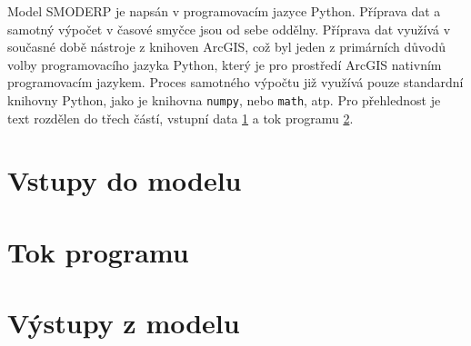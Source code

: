 Model SMODERP je napsán v programovacím jazyce Python. Příprava dat a samotný výpočet v časové smyčce jsou od sebe oddělny. Příprava dat využívá v současné době nástroje z knihoven ArcGIS, což byl jeden z primárních důvodů volby  programovacího jazyka Python, který je pro prostředí ArcGIS nativním programovacím jazykem. Proces samotného výpočtu již využívá pouze standardní knihovny Python, jako je knihovna \texttt{numpy}, nebo \texttt{math}, atp. Pro přehlednost je text rozdělen do třech částí, vstupní data \ref{kap:vstupy} a tok programu \ref{kap:tok}. %


\newpage
        \setcounter{section}{0}
	
	\section{Vstupy do modelu} \label{kap:vstupy}
	 
	
	\section{Tok programu} \label{kap:tok}
	
	
	\section{Výstupy z modelu} \label{kap:vystupy}
	

